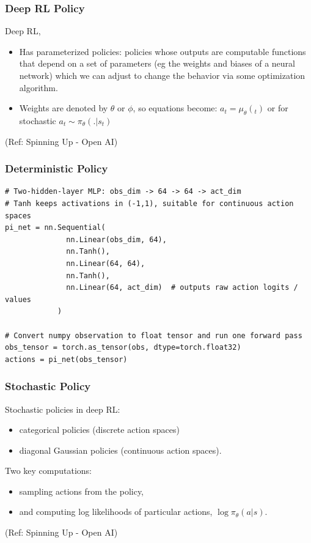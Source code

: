 \begin{frame}[fragile]\frametitle{Deep RL Policy}

Deep RL, 
\begin{itemize}

\item Has parameterized policies: policies whose outputs are computable functions that depend on a set of parameters (eg the weights and biases of a neural network) which we can adjust to change the behavior via some optimization algorithm.
\item Weights are denoted by $\theta$ or $\phi$, so equations become: $a_t=\mu_\theta(_t)$ or for stochastic $a_t \sim \pi_\theta(.|s_t)$
\end{itemize}

{\tiny (Ref: Spinning Up - Open AI)}


\end{frame}

\begin{frame}[fragile]\frametitle{Deterministic Policy}

\begin{lstlisting}
# Two-hidden-layer MLP: obs_dim -> 64 -> 64 -> act_dim
# Tanh keeps activations in (-1,1), suitable for continuous action spaces
pi_net = nn.Sequential(
              nn.Linear(obs_dim, 64),
              nn.Tanh(),
              nn.Linear(64, 64),
              nn.Tanh(),
              nn.Linear(64, act_dim)  # outputs raw action logits / values
            )

# Convert numpy observation to float tensor and run one forward pass
obs_tensor = torch.as_tensor(obs, dtype=torch.float32)
actions = pi_net(obs_tensor)
\end{lstlisting}

\end{frame}

\begin{frame}[fragile]\frametitle{Stochastic  Policy}

Stochastic policies in deep RL: 
\begin{itemize}
\item categorical policies (discrete action spaces) 
\item diagonal Gaussian policies (continuous action spaces).
\end{itemize}

Two key computations:
\begin{itemize}
\item sampling actions from the policy,
\item and computing log likelihoods of particular actions, $\log \pi_{\theta}(a|s)$.
\end{itemize}

{\tiny (Ref: Spinning Up - Open AI)}
\end{frame}

